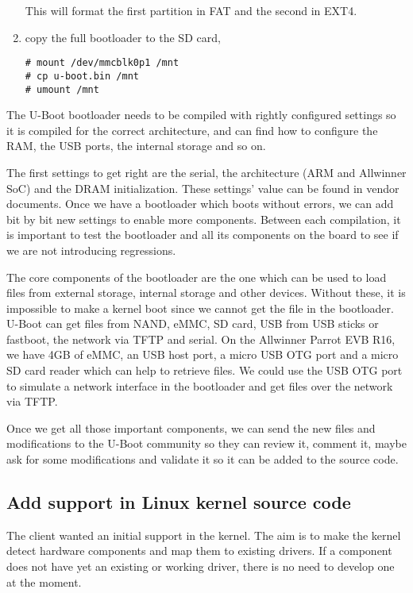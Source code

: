 \begin{enumerate}
This will format the first partition in FAT and the second in EXT4.

  \item copy the full bootloader to the SD card,

\begin{verbatim}
# mount /dev/mmcblk0p1 /mnt
# cp u-boot.bin /mnt
# umount /mnt
\end{verbatim}
\end{enumerate}

The U-Boot bootloader needs to be compiled with rightly configured settings so it is compiled for the correct architecture, and can find how to configure the RAM, the USB ports, the internal storage and so on.

The first settings to get right are the serial, the architecture (ARM and Allwinner SoC) and the DRAM initialization. These settings' value can be found in vendor documents. Once we have a bootloader which boots without errors, we can add bit by bit new settings to enable more components. Between each compilation, it is important to test the bootloader and all its components on the board to see if we are not introducing regressions.

The core components of the bootloader are the one which can be used to load files from external storage, internal storage and other devices. Without these, it is impossible to make a kernel boot since we cannot get the file in the bootloader. U-Boot can get files from NAND, eMMC, SD card, USB from USB sticks or fastboot, the network via TFTP and serial. On the Allwinner Parrot EVB R16, we have 4GB of eMMC, an USB host port, a micro USB OTG port and a micro SD card reader which can help to retrieve files. We could use the USB OTG port to simulate a network interface in the bootloader and get files over the network via TFTP.

Once we get all those important components, we can send the new files and modifications to the U-Boot community so they can review it, comment it, maybe ask for some modifications and validate it so it can be added to the source code.

\subsection{Add support in Linux kernel source code}

The client wanted an initial support in the kernel. The aim is to make the kernel detect hardware components and map them to existing drivers. If a component does not have yet an existing or working driver, there is no need to develop one at the moment.

